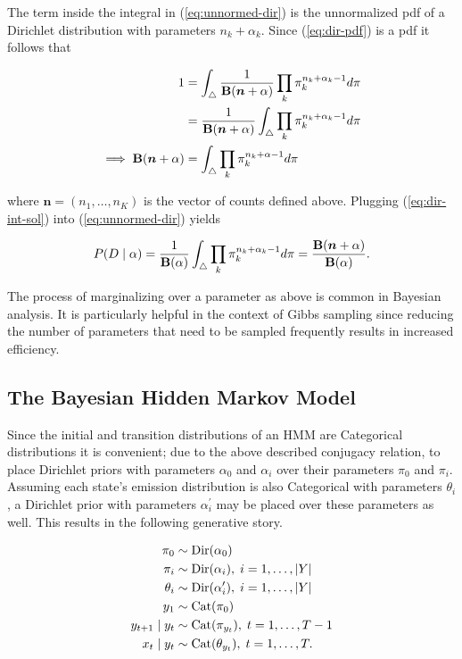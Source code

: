\documentclass[12pt]{report}
\newcommand{\p}[0]{\prime}
\newcommand{\1}[0]{\mathbbm{1}}
\newcommand{\Cat}[0]{\textnormal{Cat}}
\newcommand{\Dir}[0]{\textnormal{Dir}}
\newcommand{\Bf}[0]{\text{\textbf{B}}}
\DeclarePairedDelimiter\abs{\lvert}{\rvert}%
\begin{document}
The term inside the integral in (\ref{eq:unnormed-dir}) is the unnormalized \ac{pdf}
of a Dirichlet distribution with parameters $n_k + \alpha_k$. Since (\ref{eq:dir-pdf})
is a \ac{pdf} it follows that

\begin{align}
    1
    &= \int_\triangle \frac{1}{\Bf(\bm{n} + \alpha)} \prod_k \pi_k^{n_k + \alpha_k - 1} d \pi \nonumber \\
    &= \frac{1}{\Bf(\bm{n} + \alpha)} \int_\triangle \prod_k \pi_k^{n_k + \alpha_k - 1} d \pi \nonumber  \\
\implies \Bf(\bm{n} + \alpha) &= \int_\triangle \prod_k \pi_k^{n_k + \alpha - 1} d \pi \label{eq:dir-int-sol}
\end{align}

where $\bm{n} = (n_1, \ldots, n_K)$ is the vector of counts defined above.
Plugging (\ref{eq:dir-int-sol}) into (\ref{eq:unnormed-dir}) yields

\begin{equation}
    P(D \mid \alpha)
    = \frac{1}{\Bf(\alpha)}\int_{\triangle} \prod_k \pi_k^{n_k + \alpha_k - 1} d \pi
    = \frac{\Bf(\bm{n} + \alpha)}{\Bf(\alpha)}. \label{eq:dpcmarg}
\end{equation}

The process of marginalizing over a parameter as above is common in Bayesian analysis.
It is particularly helpful in the context of Gibbs sampling since reducing the number
of parameters that need to be sampled frequently results in increased efficiency.

\subsection{The Bayesian Hidden Markov Model}
Since the initial and transition distributions of an \ac{HMM} are Categorical distributions
it is convenient; due to the above described conjugacy relation, to place Dirichlet priors
with parameters $\alpha_0$ and $\alpha_i$ over their parameters $\pi_0$ and $\pi_i$.
Assuming each state's emission distribution is also Categorical
with parameters $\theta_i$, a Dirichlet prior with parameters $\alpha_i^\p$ may be placed
over these parameters as well. This results in the following generative story.

\begin{align*}
    \pi_0 & \sim \Dir(\alpha_0) \\
    \pi_i & \sim \Dir(\alpha_i),\; i = 1, \ldots, \abs{Y} \\
    \theta_i & \sim \Dir(\alpha_i^\p),\; i = 1, \ldots, \abs{Y} \\
    y_1 & \sim \Cat(\pi_0) \\
    y_{t+1} \mid y_t & \sim \Cat(\pi_{y_t}),\; t = 1, \ldots, T-1 \\
    x_t \mid y_t & \sim \Cat(\theta_{y_t}), \; t = 1, \ldots, T.
\end{align*}
\end{document}
